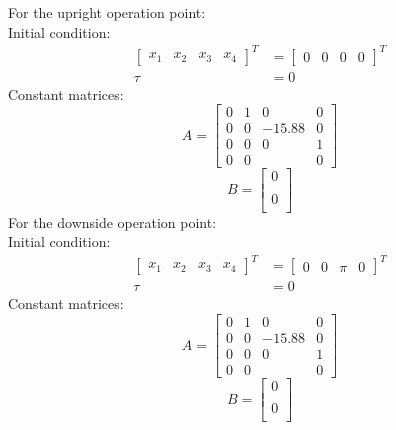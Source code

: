 For the upright operation point:\\
Initial condition:
\begin{equation}
\begin{split}
\begin{bmatrix}
x_1 & x_2 & x_3 & x_4
\end{bmatrix}^T& = 
\begin{bmatrix}
0 & 0 & 0 & 0
\end{bmatrix}^T\\
\tau& = 0
\end{split}
\end{equation}
Constant matrices:
\begin{equation} A = 
\begin{bmatrix}
0&1&0&0\\0&0&-15.88&0\\0&0&0&1\\0&0&&0
\end{bmatrix}
\end{equation}
\begin{equation}B = 
\begin{bmatrix}
0\\ \\0\\
\end{bmatrix}
\end{equation}
For the downside operation point:\\
Initial condition:
\begin{equation}
\begin{split}
\begin{bmatrix}
x_1 & x_2 & x_3 & x_4
\end{bmatrix}^T& = 
\begin{bmatrix}
0 & 0 & \pi & 0
\end{bmatrix}^T\\
\tau& = 0
\end{split}
\end{equation}
Constant matrices:
\begin{equation} A = 
\begin{bmatrix}
0&1&0&0\\0&0&-15.88&0\\0&0&0&1\\0&0&&0
\end{bmatrix}
\end{equation}
\begin{equation}B = 
\begin{bmatrix}
0\\ \\0\\
\end{bmatrix}
\end{equation}




